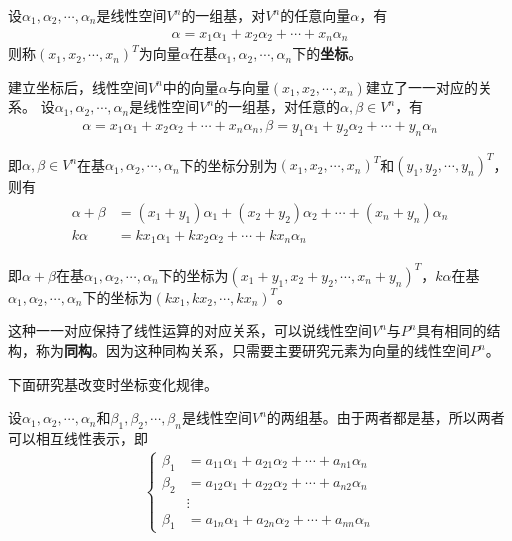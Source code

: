 \begin{definition}
    设$\alpha_{1},\alpha_{2},\cdots,\alpha_{n}$是线性空间$V^{n}$的一组基，对$V^{n}$的任意向量$\alpha$，有
    \begin{eqnarray}
        \alpha=x_{1}\alpha_{1}+x_{2}\alpha_{2}+\cdots+x_{n}\alpha_{n}\nonumber
    \end{eqnarray}
    则称$\left(x_{1},x_{2},\cdots,x_{n}\right)^{T}$为向量$\alpha$在基$\alpha_{1},\alpha_{2},\cdots,\alpha_{n}$下的\textbf{坐标}。
\end{definition}

建立坐标后，线性空间$V^{n}$中的向量$\alpha$与向量$\left(x_{1},x_{2},\cdots,x_{n}\right)$建立了一一对应的关系。
设$\alpha_{1},\alpha_{2},\cdots,\alpha_{n}$是线性空间$V^{n}$的一组基，对任意的$\alpha,\beta\in{V^{n}}$，有
\begin{eqnarray}
    \alpha=x_{1}\alpha_{1}+x_{2}\alpha_{2}+\cdots+x_{n}\alpha_{n},\beta=y_{1}\alpha_{1}+y_{2}\alpha_{2}+\cdots+y_{n}\alpha_{n}\nonumber
\end{eqnarray}

即$\alpha,\beta\in{V^{n}}$在基$\alpha_{1},\alpha_{2},\cdots,\alpha_{n}$下的坐标分别为$\left(x_{1},x_{2},\cdots,x_{n}\right)^{T}$和$\left(y_{1},y_{2},\cdots,y_{n}\right)^{T}$，则有
\begin{eqnarray}
    \begin{aligned}
        \alpha+\beta&=(x_{1}+y_{1})\alpha_{1}+(x_{2}+y_{2})\alpha_{2}+\cdots+(x_{n}+y_{n})\alpha_{n}\\
        k\alpha&=kx_{1}\alpha_{1}+kx_{2}\alpha_{2}+\cdots+kx_{n}\alpha_{n}
    \end{aligned}
\end{eqnarray}

即$\alpha+\beta$在基$\alpha_{1},\alpha_{2},\cdots,\alpha_{n}$下的坐标为$\left(x_{1}+y_{1},x_{2}+y_{2},\cdots,x_{n}+y_{n}\right)^{T}$，$k\alpha$在基$\alpha_{1},\alpha_{2},\cdots,\alpha_{n}$下的坐标为$\left(kx_{1},kx_{2},\cdots,kx_{n}\right)^{T}$。

这种一一对应保持了线性运算的对应关系，可以说线性空间$V^{n}$与$P^{n}$具有相同的结构，称为\textbf{同构}。因为这种同构关系，只需要主要研究元素为向量的线性空间$P^{n}$。

下面研究基改变时坐标变化规律。

设$\alpha_{1},\alpha_{2},\cdots,\alpha_{n}$和$\beta_{1},\beta_{2},\cdots,\beta_{n}$是线性空间$V^{n}$的两组基。由于两者都是基，所以两者可以相互线性表示，即
\begin{eqnarray}
    \begin{cases}
        \beta_{1}&=a_{11}\alpha_{1}+a_{21}\alpha_{2}+\cdots+a_{n1}\alpha_{n}\\
        \beta_{2}&=a_{12}\alpha_{1}+a_{22}\alpha_{2}+\cdots+a_{n2}\alpha_{n}\\
        &\vdots\\
        \beta_{1}&=a_{1n}\alpha_{1}+a_{2n}\alpha_{2}+\cdots+a_{nn}\alpha_{n}
    \end{cases}\label{equation:1-4}
\end{eqnarray}

